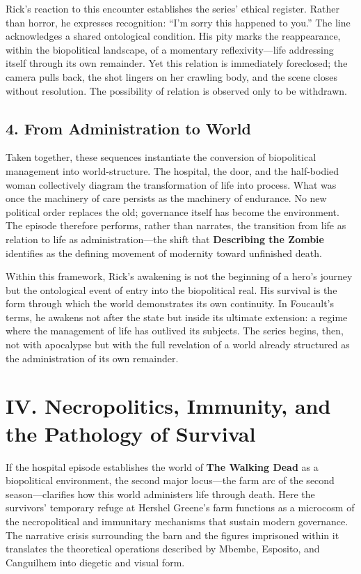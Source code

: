 \documentclass[11pt]{article}
\begin{document}
Rick’s reaction to this encounter establishes the series’ ethical register.  Rather than horror, he expresses recognition: “I’m sorry this happened to you.”  The line acknowledges a shared ontological condition.  His pity marks the reappearance, within the biopolitical landscape, of a momentary reflexivity—life addressing itself through its own remainder.  Yet this relation is immediately foreclosed; the camera pulls back, the shot lingers on her crawling body, and the scene closes without resolution.  The possibility of relation is observed only to be withdrawn.  
\subsection*{4. From Administration to World}
\label{sec:org39b2b39}

Taken together, these sequences instantiate the conversion of biopolitical management into world-structure.  The hospital, the door, and the half-bodied woman collectively diagram the transformation of life into process.  What was once the machinery of care persists as the machinery of endurance.  No new political order replaces the old; governance itself has become the environment.  The episode therefore performs, rather than narrates, the transition from life as relation to life as administration—the shift that \textbf{Describing the Zombie} identifies as the defining movement of modernity toward unfinished death.  

Within this framework, Rick’s awakening is not the beginning of a hero’s journey but the ontological event of entry into the biopolitical real.  His survival is the form through which the world demonstrates its own continuity.  In Foucault’s terms, he awakens not after the state but inside its ultimate extension: a regime where the management of life has outlived its subjects.  The series begins, then, not with apocalypse but with the full revelation of a world already structured as the administration of its own remainder.  
\section*{IV. Necropolitics, Immunity, and the Pathology of Survival}
\label{sec:org29f7d20}

If the hospital episode establishes the world of \textbf{The Walking Dead} as a biopolitical environment, the second major locus—the farm arc of the second season—clarifies how this world administers life through death.  Here the survivors’ temporary refuge at Hershel Greene’s farm functions as a microcosm of the necropolitical and immunitary mechanisms that sustain modern governance.  The narrative crisis surrounding the barn and the figures imprisoned within it translates the theoretical operations described by Mbembe, Esposito, and Canguilhem into diegetic and visual form.  
\end{document}

